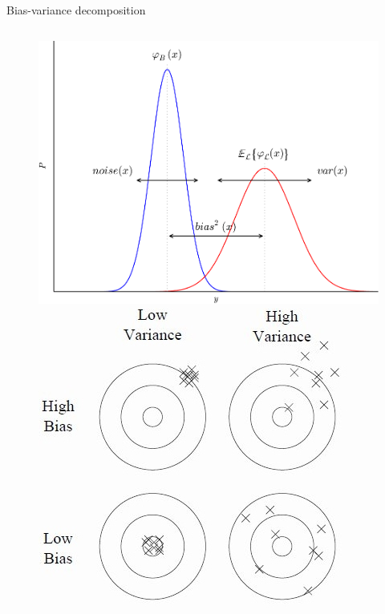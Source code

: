 \documentclass{beamer}
\begin{document}
\begin{frame}{Bias-variance decomposition}
\begin{columns}
\begin{column}{0.35\textwidth}
\begin{figure}
\vspace{-1cm}
\hspace*{-0.4cm}\includegraphics[scale=0.3]{./figures/bias-variance.pdf}\\
\includegraphics[scale=0.4]{./figures/bias-variance-darts.jpg}
\end{figure}

\end{column}
\end{columns}

\end{frame}
\end{document}
